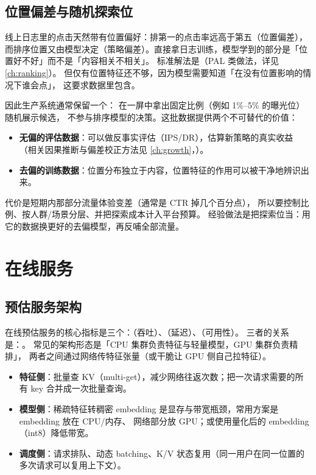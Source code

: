 \subsection{位置偏差与随机探索位}

线上日志里的点击天然带有位置偏好：排第一的点击率远高于第五（位置偏差），
而排序位置又由模型决定（策略偏差）。直接拿日志训练，模型学到的部分是「位置好不好」而不是「内容相关不相关」。
标准解法是（PAL 类做法，详见 \cref{ch:ranking}）。
但仅有位置特征还不够，因为模型需要知道「在没有位置影响的情况下谁会点」，
这要求数据里包含。

因此生产系统通常保留一个：
在一屏中拿出固定比例（例如 1\%--5\% 的曝光位）随机展示候选，
不参与排序模型的决策。这批数据提供两个不可替代的价值：

\begin{itemize}
  \item \textbf{无偏的评估数据}：可以做反事实评估（IPS/DR），估算新策略的真实收益
        （相关因果推断与偏差校正方法见 \cref{ch:growth}，\cite{saito2020doubly}）。
  \item \textbf{去偏的训练数据}：位置分布独立于内容，位置特征的作用可以被干净地辨识出来。
\end{itemize}

代价是短期内那部分流量体验变差（通常是 CTR 掉几个百分点），
所以要控制比例、按人群/场景分层、并把探索成本计入平台预算。
经验做法是把探索位当：用它的数据换更好的去偏模型，再反哺全部流量。

\section{在线服务}

\subsection{预估服务架构}

在线预估服务的核心指标是三个：（吞吐）、（延迟）、（可用性）。
三者的关系是：。
常见的架构形态是「CPU 集群负责特征与轻量模型，GPU 集群负责精排」，
两者之间通过网络传特征张量（或干脆让 GPU 侧自己拉特征）。

\begin{itemize}
  \item \textbf{特征侧}：批量查 KV（multi-get），减少网络往返次数；把一次请求需要的所有 key 合并成一次批量查询。
  \item \textbf{模型侧}：稀疏特征转稠密 embedding 是显存与带宽瓶颈，常用方案是 embedding 放在 CPU/内存、
        网络部分放 GPU；或使用量化后的 embedding（int8）降低带宽。
  \item \textbf{调度侧}：请求排队、动态 batching、K/V 状态复用（同一用户在同一位置的多次请求可以复用上下文）。
\end{itemize}

